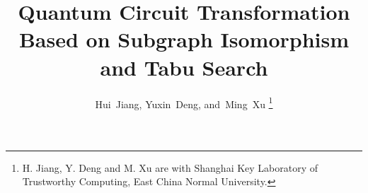 \documentclass[journal]{IEEEtran}
\begin{document}
\title{Quantum Circuit Transformation Based on Subgraph Isomorphism and Tabu Search}
%
%
%

\author{Hui~Jiang, %
        Yuxin~Deng, %
        and~Ming~Xu%
\thanks{H. Jiang, Y. Deng and M. Xu are with Shanghai Key Laboratory of Trustworthy Computing, 
	East China Normal University.}%
}


% 











\maketitle
\end{document}
